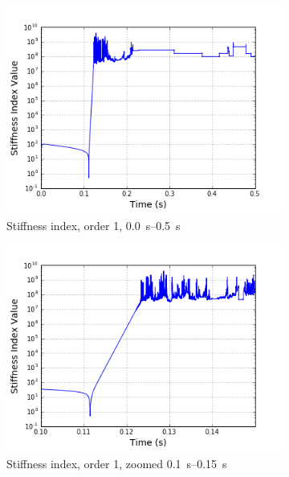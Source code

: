 \documentclass[12pt]{ussci}
\begin{document}
\begin{figure}[htbp]
\begin{subfigure}{0.43\textwidth}
        \label{fig:tempcurve1}
    \end{subfigure}
    \begin{subfigure}{0.43\textwidth}
        \includegraphics[width=\linewidth]{IndexVals_1e-07_0.png}
        \caption{Stiffness index, order 1, \SIrange{0.0}{0.5}{\second}}
        \label{fig:stiff0}
    \end{subfigure}
    \begin{subfigure}{0.43\textwidth}
        \includegraphics[width=\linewidth]{IndexVals_1e-07_1.png}
        \caption{Stiffness index, order 1, zoomed \SIrange{0.1}{0.15}{\second}}
        \label{fig:stiff1}
    \end{subfigure}
        \begin{subfigure}{0.43\textwidth}

\end{subfigure}
\end{figure}
\end{document}
